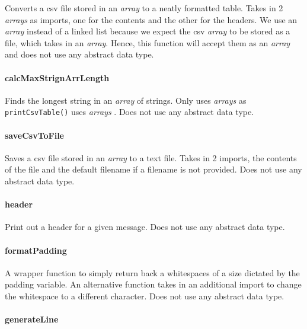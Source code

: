 \documentclass[a4paper, 12pt, titlepage]{article}
\newcommand{\code}[1]{\small\texttt{#1}\normalsize}
\begin{document}
Converts a csv file stored in an \textit{array} to a neatly formatted table.
Takes in 2 \textit{arrays} as imports, one for the contents and the other for
the headers. We use an \textit{array} instead of a linked list because we
expect the csv \textit{array} to be stored as a file, which takes in an
\textit{array}. Hence, this function will accept them as an \textit{array}
and does not use any abstract data type.

\paragraph{calcMaxStrignArrLength} \hspace{0pt}

Finds the longest string in an \textit{array} of strings. Only uses
\textit{arrays} as \code{printCsvTable()} uses \textit{arrays} . Does not use
any abstract data type.

\paragraph{saveCsvToFile} \hspace{0pt}

Saves a csv file stored in an \textit{array} to a text file. Takes in 2
imports, the contents of the file and the default filename if a filename
is not provided. Does not use any abstract data type.

\paragraph{header} \hspace{0pt}

Print out a header for a given message. Does not use any abstract data type.

\paragraph{formatPadding} \hspace{0pt}

A wrapper function to simply return back a whitespaces of a size dictated by
the padding variable. An alternative function takes in an additional
import to change the whitespace to a different character. Does not use any
abstract data type.

\paragraph{generateLine} \hspace{0pt}
\end{document}

